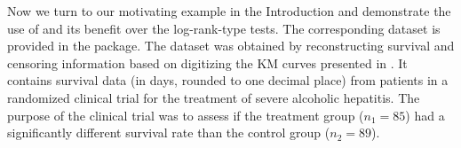 Now we turn to our motivating example in the Introduction and
demonstrate the use of  and its benefit over the log-rank-type tests. The corresponding dataset  is provided in the  package.  %
The dataset was obtained by reconstructing survival and censoring information \citep[][]{KMreconstruct:2012} based on digitizing the KM curves presented in  \citet{hepatitis:2011}. It contains survival data (in days, rounded to one decimal place) from patients in a randomized clinical trial for the treatment of severe alcoholic hepatitis.
The purpose of the clinical trial was to assess if the treatment group ($n_1=85$) had a significantly different survival rate than the control group ($n_2=89$). %


